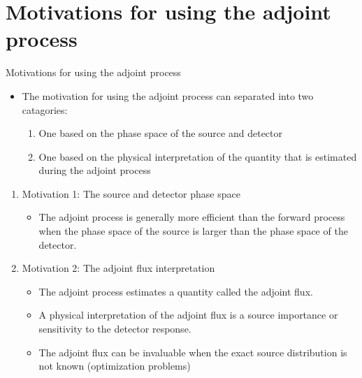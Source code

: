 \documentclass{beamer}
\begin{document}
\section{Motivations for using the adjoint process}
\begin{frame}{Motivations for using the adjoint process}

  \begin{itemize} 
    \item The motivation for using the adjoint process can separated into two
    catagories:
      \begin{enumerate}
        \item One based on the phase space of the source and detector
        \item One based on the physical interpretation of the quantity that is 
          estimated during the adjoint process
      \end{enumerate}
  \end{itemize}

  \begin{enumerate}
    \item Motivation 1: The source and detector phase space
      \begin{itemize}
        \item The adjoint process is generally more efficient than the forward 
          process when the phase space of the source is larger than the phase 
          space of the detector.
      \end{itemize}
      \medskip
    \item Motivation 2: The adjoint flux interpretation
      \begin{itemize}
        \item The adjoint process estimates a quantity called the adjoint flux.
        \item A physical interpretation of the adjoint flux is a source 
          importance or sensitivity to the detector response.
        \item The adjoint flux can be invaluable when the exact source 
          distribution is not known (optimization problems)
      \end{itemize}
  \end{enumerate}

\end{frame}
\end{document}
